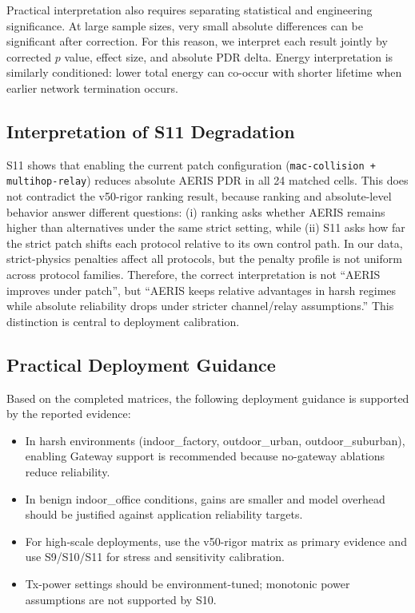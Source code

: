 ﻿\documentclass[sensors,article,submit,moreauthors,pdftex]{Definitions/mdpi}
\begin{document}
Practical interpretation also requires separating statistical and engineering significance. At large sample sizes, very small absolute differences can be significant after correction. For this reason, we interpret each result jointly by corrected $p$ value, effect size, and absolute PDR delta. Energy interpretation is similarly conditioned: lower total energy can co-occur with shorter lifetime when earlier network termination occurs.

\subsection*{Interpretation of S11 Degradation}
S11 shows that enabling the current patch configuration (\texttt{mac-collision + multihop-relay}) reduces absolute AERIS PDR in all 24 matched cells. This does not contradict the v50-rigor ranking result, because ranking and absolute-level behavior answer different questions: (i) ranking asks whether AERIS remains higher than alternatives under the same strict setting, while (ii) S11 asks how far the strict patch shifts each protocol relative to its own control path. In our data, strict-physics penalties affect all protocols, but the penalty profile is not uniform across protocol families. Therefore, the correct interpretation is not ``AERIS improves under patch'', but ``AERIS keeps relative advantages in harsh regimes while absolute reliability drops under stricter channel/relay assumptions.'' This distinction is central to deployment calibration.

\subsection*{Practical Deployment Guidance}
Based on the completed matrices, the following deployment guidance is supported by the reported evidence:
\begin{itemize}
\item In harsh environments (indoor\_factory, outdoor\_urban, outdoor\_suburban), enabling Gateway support is recommended because no-gateway ablations reduce reliability.
\item In benign indoor\_office conditions, gains are smaller and model overhead should be justified against application reliability targets.
\item For high-scale deployments, use the v50-rigor matrix as primary evidence and use S9/S10/S11 for stress and sensitivity calibration.
\item Tx-power settings should be environment-tuned; monotonic power assumptions are not supported by S10.
\end{itemize}
\end{document}
